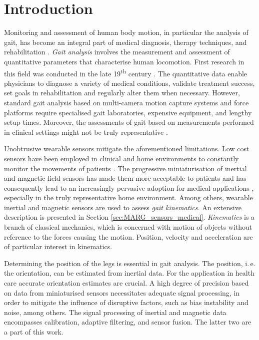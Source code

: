 \chapter{Introduction}
\label{ch:Introduction}

Monitoring and assessment of human body motion, in particular the analysis of gait, has become an integral part of medical diagnosis, therapy techniques, and rehabilitation \cite{tao_gait_2012}. \emph{Gait analysis} involves the measurement and assessment of quantitative parameters that characterise human locomotion. First research in this field was conducted in the late 19\textsuperscript{th} century \cite{tao_gait_2012}. The quantitative data enable physicians to diagnose a variety of medical conditions, validate treatment success, set goals in rehabilitation and regularly alter them when necessary. However, standard gait analysis based on multi-camera motion capture systems and force platforms require specialised gait laboratories, expensive equipment, and lengthy setup times. Moreover, the assessments of gait based on measurements performed in clinical settings might not be truly representative \cite{bonato_advances_2005}.

Unobtrusive wearable sensors mitigate the aforementioned limitations. Low cost sensors have been employed in clinical and home environments to constantly monitor the movements of patients \cite{godfrey_direct_2008}. The progressive miniaturisation of inertial and magnetic field sensors has made them more acceptable to patients and has consequently lead to an increasingly pervasive adoption for medical applications \cite{wee_soon_ambulatory_2008}, especially in the truly representative home environment.  Among others, wearable inertial and magnetic sensors are used to assess \emph{gait kinematics}. An extensive description is presented in Section \ref{sec:MARG_sensors_medical}. \emph{Kinematics} is a branch of classical mechanics, which is concerned with motion of objects without reference to the forces causing the motion. Position, velocity and acceleration are of particular interest in kinematics.

Determining the position of the legs is essential in gait analysis. The position, i.\,e. the orientation, can be estimated from inertial data. For the application in health care accurate orientation estimates are crucial. A high degree of precision based on data from miniaturised sensors necessitates adequate signal processing, in order to mitigate the influence of disruptive factors, such as bias instability and noise, among others. The signal processing of inertial and magnetic data encompasses calibration, adaptive filtering, and sensor fusion. The latter two are a part of this work.

